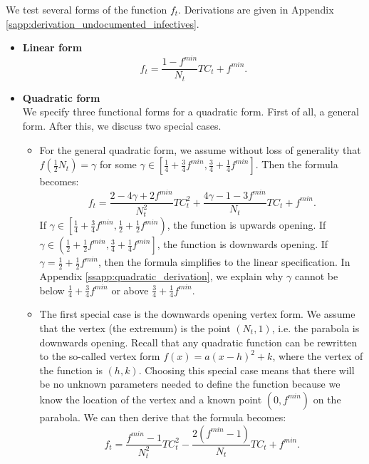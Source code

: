 \documentclass[12pt]{article}
\begin{document}
	We test several forms of the function $f_t$. Derivations are given in Appendix \ref{sapp:derivation_undocumented_infectives}.
	\begin{itemize}
		\item \textbf{Linear form}
		    \begin{equation} \label{eq:linear_functional_form}
		        f_t = \frac{1-f^{min}}{N_t}TC_t + f^{min}.
		    \end{equation}
    		
    	\item \textbf{Quadratic form}\\
    	We specify three functional forms for a quadratic form. First of all, a general form. After this, we discuss two special cases.
    	    \begin{itemize}
    	        \item For the general quadratic form, we assume without loss of generality that $f\left(\frac{1}{2}N_t\right) = \gamma$ for some $\gamma \in \left[\frac{1}{4} + \frac{3}{4}f^{min}, \frac{3}{4} + \frac{1}{4} f^{min}\right]$. Then the formula becomes:
    	            \begin{equation} \label{eq:quadratic_functional_form}
    	                f_t = \frac{2 - 4\gamma + 2f^{min}}{N_t^2}TC_t^2 + \frac{4\gamma - 1 - 3f^{min}}{N_t}TC_t + f^{min}.
    	            \end{equation}
		        If $\gamma \in \left[\frac{1}{4} + \frac{3}{4}f^{min}, \frac{1}{2} + \frac{1}{2}f^{min}\right)$, the function is upwards opening. If $\gamma \in \left(\frac{1}{2} + \frac{1}{2}f^{min}, \frac{3}{4} + \frac{1}{4} f^{min}\right]$, the function is downwards opening. If $\gamma = \frac{1}{2} + \frac{1}{2}f^{min}$, then the formula simplifies to the linear specification. In Appendix \ref{ssapp:quadratic_derivation}, we explain why $\gamma$ cannot be below $\frac{1}{4} + \frac{3}{4}f^{min}$ or above $\frac{3}{4} + \frac{1}{4} f^{min}$.
		        
		        \item The first special case is the downwards opening vertex form. We assume that the vertex (the extremum) is the point $(N_t, 1)$, i.e. the parabola is downwards opening. Recall that any quadratic function can be rewritten to the so-called vertex form $f(x) = a(x - h)^2 + k$, where the vertex of the function is $(h, k)$. Choosing this special case means that there will be no unknown parameters needed to define the function because we know the location of the vertex and a known point $(0, f^{min})$ on the parabola. We can then derive that the formula becomes:
		            \begin{equation} \label{eq:quadratic_downwards_functional_form}
		                f_t = \frac{f^{min}-1}{N_t^2}TC_t^2 - \frac{2(f^{min}-1)}{N_t}TC_t + f^{min}.
		            \end{equation}
		        

\end{itemize}
\end{itemize}
\end{document}
